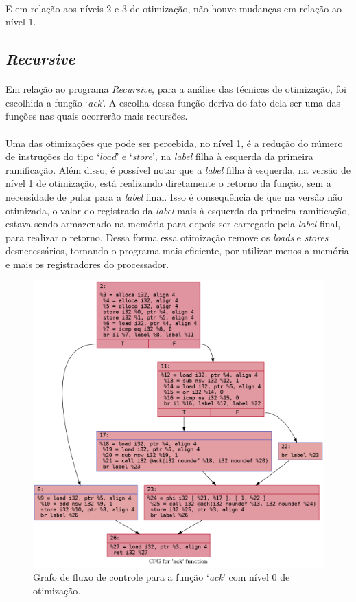 \documentclass[12pt]{article}
\begin{document}
\paragraph{}E em relação aos níveis 2 e 3 de otimização, não houve mudanças em relação ao nível 1.

\FloatBarrier

\subsection{\textit{Recursive}}

\paragraph{}Em relação ao programa \textit{Recursive}, para a análise das técnicas de otimização, foi escolhida a função ‘\textit{ack}’. A escolha dessa função deriva do fato dela ser uma das funções nas quais ocorrerão mais recursões.

\paragraph{}Uma das otimizações que pode ser percebida, no nível 1, é a redução do número de instruções do tipo ‘\textit{load}’ e ‘\textit{store}’, na \textit{label} filha à esquerda da primeira ramificação. Além disso, é possível notar que a \textit{label} filha à esquerda, na versão de nível 1 de otimização, está realizando diretamente o retorno da função, sem a necessidade de pular para a \textit{label} final. Isso é consequência de que na versão não otimizada, o valor do registrado da \textit{label} mais à esquerda da primeira ramificação, estava sendo armazenado na memória para depois ser carregado pela \textit{label} final, para realizar o retorno. Dessa forma essa otimização remove os \textit{loads} e \textit{stores} desnecessários, tornando o programa mais eficiente, por utilizar menos a memória e mais os registradores do processador.

\begin{figure}
    \centering
    \includegraphics[width=0.5\linewidth]{recursive_.ack_O0.png}
    \caption{Grafo de fluxo de controle para a função ‘\textit{ack}’ com nível 0 de otimização.}
\end{figure}
\end{document}
